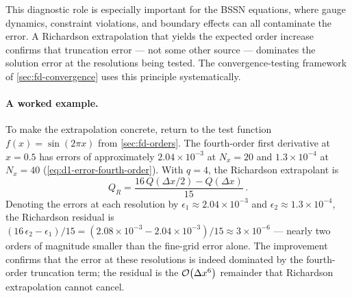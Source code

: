 This diagnostic role is especially important for the BSSN equations, where
gauge dynamics, constraint violations, and boundary effects can all
contaminate the error.  A Richardson extrapolation that yields the
expected order increase confirms that truncation error --- not some
other source --- dominates the solution error at the resolutions being
tested.  The convergence-testing framework of \cref{sec:fd-convergence}
uses this principle systematically.

\paragraph{A worked example.}

To make the extrapolation concrete, return to the test function
$f(x) = \sin(2\pi x)$ from \cref{sec:fd-orders}.  The fourth-order first
derivative at $x = 0.5$ has errors of approximately
$2.04 \times 10^{-3}$ at $N_x = 20$ and $1.3 \times 10^{-4}$ at
$N_x = 40$ (\cref{eq:d1-error-fourth-order}).  With $q = 4$, the
Richardson extrapolant is
%
\begin{equation}
  Q_R = \frac{16\,Q(\Delta x/2) - Q(\Delta x)}{15} \,.
  \label{eq:richardson-worked}
\end{equation}
%
Denoting the errors at each resolution by $\epsilon_1 \approx 2.04 \times
10^{-3}$ and $\epsilon_2 \approx 1.3 \times 10^{-4}$, the Richardson
residual is
$(16\,\epsilon_2 - \epsilon_1)/15
 = (2.08 \times 10^{-3} - 2.04 \times 10^{-3})/15
 \approx 3 \times 10^{-6}$
--- nearly two orders of magnitude smaller than the fine-grid error alone.
The improvement confirms that the error at these resolutions is indeed
dominated by the fourth-order truncation term; the residual is the
$\mathcal{O}\!\left(\Delta x^6\right)$ remainder that Richardson extrapolation cannot
cancel.
